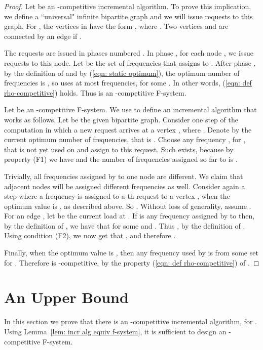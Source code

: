 \documentclass[11pt]{article}
\begin{document}
\begin{proof}

Let  be an -competitive incremental algorithm.
To prove this implication, we define a ``universal" infinite bipartite
graph  and we will issue requests to this graph.
For , the vertices in  have the form ,
where . Two vertices  and  are
connected by an edge if . 

The requests are issued in phases numbered . In phase ,
for each node , we issue  requests to this node.
Let  be the set of frequencies that 
assigns to . After phase , by the definition of
 and by (\ref{eqn: static optimum}),
the optimum number of frequencies is , so 
uses at most  frequencies, for some . 
In other words, (\ref{eqn: def rho-competitive}) holds.
Thus  is an -competitive F-system.


Let  be an -competitive F-system. We use  to define
an incremental algorithm  that works as follows. 
Let  be the given bipartite graph. Consider one step
of the computation in which a new request arrives at a
vertex , where . Denote by 
the current optimum number of frequencies, that is
. Choose any frequency
, for , that is not yet used on 
and assign  to this request. Such  exists, because by
property (F1) we have
 and the number of frequencies assigned so far 
to  is . 

Trivially, all frequencies assigned by  to one node are different.
We claim that adjacent nodes will be assigned
different frequencies as well. Consider again a step where a frequency
 is assigned to a th request to a vertex , 
when the optimum value is , as described above. So .
Without loss of generality, assume . For an edge ,
let  be the current load at . If
 is any frequency assigned by  to  then, by
the definition of , we have that
 for some  and .
Thus , by the definition of .
Using condition (F2), we now get that
, and therefore .

Finally, when the optimum value is , then any frequency
used by  is from some set  for
. Therefore  is -competitive, by the
property (\ref{eqn: def rho-competitive}) of .
\end{proof}




\section{An Upper Bound}
\label{sec: an upper bound}

In this section we prove that there is an -competitive
incremental algorithm, for .
Using Lemma~\ref{lem: incr alg equiv f-system}, it is sufficient to
design an -competitive F-system.
\end{document}
